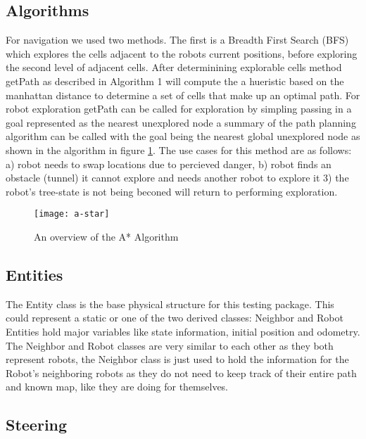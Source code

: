 \subsection{Algorithms}
For navigation we used two methods. The first is a Breadth First Search (BFS) which explores the cells adjacent to the robots
current positions, before exploring the second level of adjacent cells. After determinining explorable cells method getPath as described in Algorithm 1 will compute the a hueristic based on the manhattan distance to determine a set of cells that make up an optimal path. For robot exploration getPath can be called for exploration by simpling passing in a goal represented as the nearest unexplored node a summary of the path planning algorithm can be called with the goal being the nearest global unexplored node as shown in the algorithm in figure \ref{fig:a-star}.
The use cases for this method are as follows: a) robot needs to swap locations due to percieved danger, b) robot finds an obstacle (tunnel) it cannot explore and needs another robot to explore it 3) the robot's tree-state is not being beconed will return to performing exploration.
\begin{figure}[H]
 \centering
   \texttt{[image: a-star]}
 \caption{An overview of the A* Algorithm \cite{a-star}} \label{fig:a-star}
\end{figure}


\subsection{Entities}
The Entity class is the base physical structure for this testing package. This could represent a static
or one of the two derived classes: Neighbor and Robot Entities hold major variables like state
information, initial position and odometry. The Neighbor and Robot classes are very similar to each other
as they both represent robots, the Neighbor class is just used to hold the information for the
Robot's neighboring robots as they do not need to keep track of their entire path and known map,
like they are doing for themselves.


\subsection{Steering}

